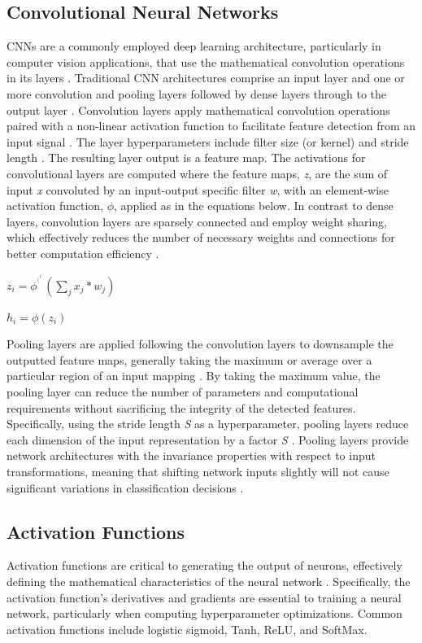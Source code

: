 \documentclass{article}
\begin{document}
\subsection{Convolutional Neural Networks}
CNNs are a commonly employed deep learning architecture, particularly in computer vision applications, that use the mathematical convolution operations in its layers \cite{grosse2019lecture09}. Traditional CNN architectures comprise an input layer and one or more convolution and pooling layers followed by dense layers through to the output layer \cite{amidi_amidi}. 
Convolution layers apply mathematical convolution operations paired with a non-linear activation function to facilitate feature detection from an input signal \cite{grosse2019lecture09}. The layer hyperparameters include filter size (or kernel) and stride length \cite{amidi_amidi}. The resulting layer output is a feature map.  The activations for convolutional layers are computed where the feature maps, \emph{z}, are the sum of input \emph{x} convoluted by an input-output specific filter \emph{w}, with an element-wise activation function, $\phi$, applied as in the equations below. In contrast to dense layers, convolution layers are sparsely connected and employ weight sharing, which effectively reduces the number of necessary weights and connections for better computation efficiency \cite{grosse2019lecture09}. 
\newline
\newline
\centerline{$z_{i} = \phi^{^(^1^)}(\sum_{j} x_{j}*w_j)$}
\centerline{$h_i = \phi(z_i)$ \cite{grosse2019lecture09}}
\newline

Pooling layers are applied following the convolution layers to downsample the outputted feature maps, generally taking the maximum or average over a particular region of an input mapping \cite{grosse2019lecture09,amidi_amidi}. By taking the maximum value, the pooling layer can reduce the number of parameters and computational requirements without sacrificing the integrity of the detected features. Specifically, using the stride length \emph{S} as a hyperparameter, pooling layers reduce each dimension of the input representation by a factor \emph{S} \cite{grosse2019lecture09}. Pooling layers provide network architectures with the invariance properties with respect to input transformations, meaning that shifting network inputs slightly will not cause significant variations in classification decisions \cite{grosse2019lecture09}. 

\subsection{Activation Functions}
Activation functions are critical to generating the output of neurons, effectively defining the mathematical characteristics of the neural network \cite{lederer2021activation}. Specifically, the activation function’s derivatives and gradients are essential to training a neural network, particularly when computing hyperparameter optimizations. Common activation functions include logistic sigmoid, Tanh, ReLU, and SoftMax. 
\end{document}
